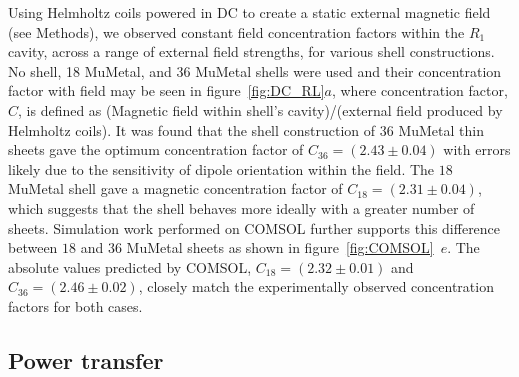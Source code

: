 \documentclass[11pt]{iopart}
\begin{document}
Using Helmholtz coils powered in DC to create a static external
magnetic field (see Methods), we observed constant field concentration
factors within the $R_1$ cavity, across a range of external field
strengths, for various shell constructions. No shell, 18 MuMetal, and
36 MuMetal shells were used and their concentration factor with field
may be seen in figure~\ref{fig:DC_RL}$a$, where concentration factor,
$C$, is defined as (Magnetic field within shell's cavity)/(external
field produced by Helmholtz coils). It was found that the shell
construction of $36$ MuMetal thin sheets gave the optimum
concentration factor of $C_{36} = (2.43\pm0.04)$ with errors likely
due to the sensitivity of dipole orientation within the field. The
$18$ MuMetal shell gave a magnetic concentration factor of $C_{18} =
(2.31\pm0.04)$, which suggests that the shell behaves more ideally
with a greater number of sheets. Simulation work performed on COMSOL
further supports this difference between $18$ and $36$ MuMetal sheets
as shown in figure~\ref{fig:COMSOL}~$e$. The absolute values predicted
by COMSOL, $C_{18}= (2.32\pm0.01)$ and $C_{36} = (2.46\pm0.02)$,
closely match the experimentally observed concentration factors for
both cases.

\subsection{Power transfer}
\end{document}
